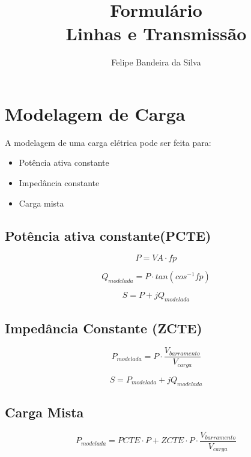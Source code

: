 \documentclass[a4paper, 10pt, twocolumn]{article}
\title{Formulário\\Linhas e Transmissão}
\author{Felipe Bandeira da Silva}
\begin{document}
\maketitle
\section{Modelagem de Carga}

A modelagem de uma carga elétrica pode ser feita para:

\begin{itemize}
\item Potência ativa constante
\item Impedância constante
\item Carga mista
\end{itemize}

\subsection{Potência ativa constante(PCTE)}
    
\begin{equation}
P = VA \cdot fp
\end{equation}

\begin{equation}   
Q_{modelada} = P \cdot tan(cos^{-1}fp)
\end{equation}

\begin{equation}
S = P+jQ_{modelada}
\end{equation}

\subsection{Impedância Constante (ZCTE)}

\begin{equation}
P_{modelada} = P \cdot \frac{V_{barramento}}{V_{carga}}
\end{equation}

\begin{equation}   
S = P_{modelada} + jQ_{modelada}  
\end{equation}

\subsection{Carga Mista}

\begin{equation}
P_{modelada} =PCTE \cdot P +  ZCTE \cdot  P \cdot \frac{V_{barramento}}{V_{carga}}
\end{equation}
\end{document}
